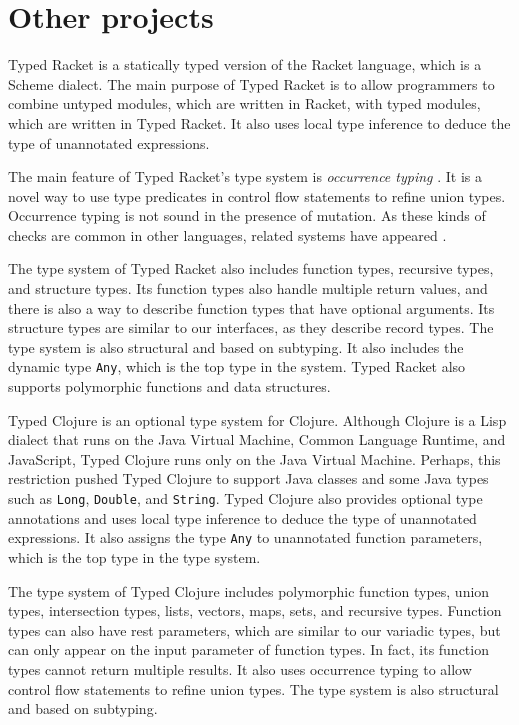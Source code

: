 \section{Other projects}

Typed Racket \cite{tobin-hochstadt2008ts} is a statically typed version
of the Racket language, which is a Scheme dialect.
The main purpose of Typed Racket is to allow programmers to combine
untyped modules, which are written in Racket, with typed modules, which are
written in Typed Racket.
It also uses local type inference to deduce the type of unannotated expressions.

The main feature of Typed Racket's type system is \emph{occurrence typing}
\cite{tobin-hochstadt2010ltu}.
It is a novel way to use type predicates in control flow statements
to refine union types.
Occurrence typing is not sound in the presence of mutation.
As these kinds of checks are common in other languages, related systems
have appeared \cite{guha2011tlc,winther2011gtp,pearce2013ccf}.

The type system of Typed Racket also includes function types, recursive
types, and structure types.
Its function types also handle multiple return values, and there is
also a way to describe function types that have optional arguments.
Its structure types are similar to our interfaces, as they describe record types.
The type system is also structural and based on subtyping.
It also includes the dynamic type \texttt{Any}, which is the top type in the system.
Typed Racket also supports polymorphic functions and data structures.

Typed Clojure \cite{bonnaire-sergeant2012typed-clojure} is an
optional type system for Clojure.
Although Clojure is a Lisp dialect that runs on the Java Virtual Machine,
Common Language Runtime, and JavaScript, Typed Clojure runs only on
the Java Virtual Machine.
Perhaps, this restriction pushed Typed Clojure to support Java classes
and some Java types such as \texttt{Long}, \texttt{Double}, and \texttt{String}.
Typed Clojure also provides optional type annotations and uses
local type inference to deduce the type of unannotated expressions.
It also assigns the type \texttt{Any} to unannotated function parameters,
which is the top type in the type system.

The type system of Typed Clojure includes polymorphic function types,
union types, intersection types, lists, vectors, maps, sets, and recursive types.
Function types can also have rest parameters, which are similar
to our variadic types, but can only appear on the input parameter
of function types.
In fact, its function types cannot return multiple results.
It also uses occurrence typing to allow control flow statements to
refine union types.
The type system is also structural and based on subtyping.

